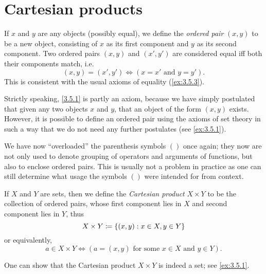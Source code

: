 \section{Cartesian products}\label{sec:3.5}

\begin{defn}\label{3.5.1}
	If \(x\) and \(y\) are any objects (possibly equal), we define the \emph{ordered pair} \((x, y)\) to be a new object, consisting of \(x\) as its first component and \(y\) as its second component.
	Two ordered pairs \((x, y)\) and \((x', y')\) are considered equal iff both their components match, i.e.
	\[
		(x, y) = (x', y') \iff (x = x' \text{ and } y = y').
	\]
	This is consistent with the usual axioms of equality (\cref{ex:3.5.3}).
\end{defn}

\begin{rmk}\label{3.5.2}
	Strictly speaking, \cref{3.5.1} is partly an axiom, because we have simply postulated that given any two objects \(x\) and \(y\), that an object of the form \((x, y)\) exists.
	However, it is possible to define an ordered pair using the axioms of set theory in such a way that we do not need any further postulates (see \cref{ex:3.5.1}).
\end{rmk}

\begin{rmk}\label{3.5.3}
	We have now ``overloaded'' the parenthesis symbols \(()\) once again;
	they now are not only used to denote grouping of operators and arguments of functions, but also to enclose ordered pairs.
	This is usually not a problem in practice as one can still determine what usage the symbols \(()\) were intended for from context.
\end{rmk}

\begin{defn}\label{3.5.4}
	If \(X\) and \(Y\) are sets, then we define the \emph{Cartesian product} \(X \times Y\) to be the collection of ordered pairs, whose first component lies in \(X\) and second component lies in \(Y\), thus
	\[
		X \times Y \coloneqq \left\lbrace(x, y) : x \in X, y \in Y\right\rbrace
	\]
	or equivalently,
	\[
		a \in X \times Y \iff (a = (x, y) \text{ for some } x \in X \text{ and } y \in Y).
	\]
\end{defn}

\begin{rmk}\label{3.5.5}
	One can show that the Cartesian product \(X \times Y\) is indeed a set;
	see \cref{ex:3.5.1}.
\end{rmk}

